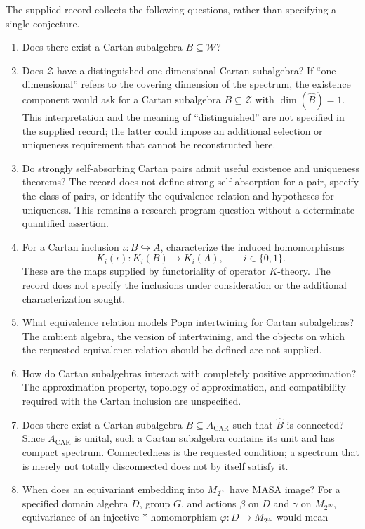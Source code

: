\documentclass[11pt]{article}
\begin{document}
The supplied record collects the following questions, rather than specifying a single conjecture.
\begin{enumerate}
\item Does there exist a Cartan subalgebra \(B\subseteq\mathcal W\)?
\item Does \(\mathcal Z\) have a distinguished one-dimensional Cartan subalgebra? If ``one-dimensional'' refers to the covering dimension of the spectrum, the existence component would ask for a Cartan subalgebra \(B\subseteq\mathcal Z\) with \(\dim(\widehat B)=1\). This interpretation and the meaning of ``distinguished'' are not specified in the supplied record; the latter could impose an additional selection or uniqueness requirement that cannot be reconstructed here.
\item Do strongly self-absorbing Cartan pairs admit useful existence and uniqueness theorems? The record does not define strong self-absorption for a pair, specify the class of pairs, or identify the equivalence relation and hypotheses for uniqueness. This remains a research-program question without a determinate quantified assertion.
\item For a Cartan inclusion \(\iota:B\hookrightarrow A\), characterize the induced homomorphisms
\[
K_i(\iota):K_i(B)\longrightarrow K_i(A),\qquad i\in\{0,1\}.
\]
These are the maps supplied by functoriality of operator \(K\)-theory. The record does not specify the inclusions under consideration or the additional characterization sought.
\item What equivalence relation models Popa intertwining for Cartan subalgebras? The ambient algebra, the version of intertwining, and the objects on which the requested equivalence relation should be defined are not supplied.
\item How do Cartan subalgebras interact with completely positive approximation? The approximation property, topology of approximation, and compatibility required with the Cartan inclusion are unspecified.
\item Does there exist a Cartan subalgebra \(B\subseteq A_{\mathrm{CAR}}\) such that \(\widehat B\) is connected? Since \(A_{\mathrm{CAR}}\) is unital, such a Cartan subalgebra contains its unit and has compact spectrum. Connectedness is the requested condition; a spectrum that is merely not totally disconnected does not by itself satisfy it.
\item When does an equivariant embedding into \(M_{2^\infty}\) have MASA image? For a specified domain algebra \(D\), group \(G\), and actions \(\beta\) on \(D\) and \(\gamma\) on \(M_{2^\infty}\), equivariance of an injective \(*\)-homomorphism \(\varphi:D\to M_{2^\infty}\) would mean

\end{enumerate}
\end{document}
